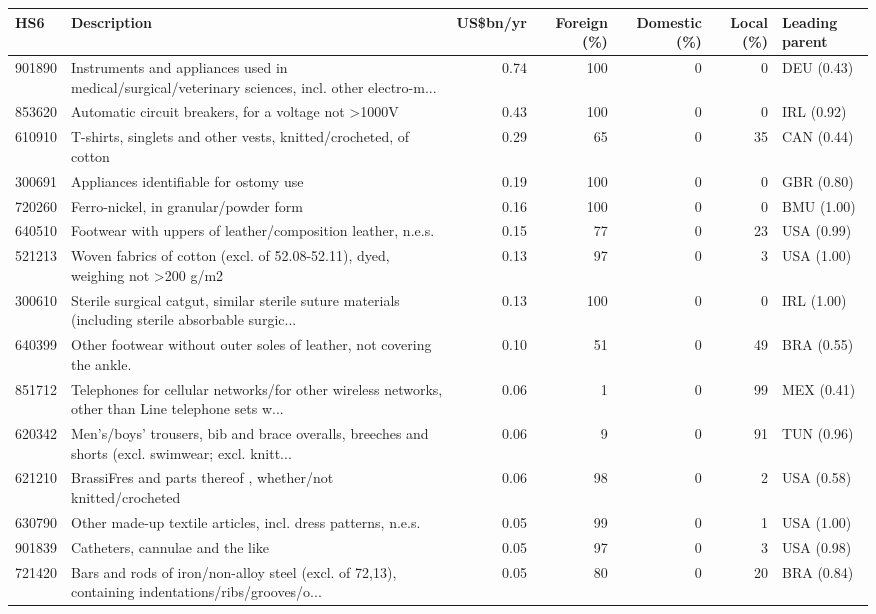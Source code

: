 \begin{tabular}{@{}l p{6.4cm} r r r r l@{}}
\toprule
HS6 & Description & US\$bn/yr & Foreign (\%) & Domestic (\%) & Local (\%) & Leading parent \\
\midrule
901890 & Instruments and appliances used in medical/\allowbreak{}surgical/\allowbreak{}veterinary sciences, incl. other electro-m... & 0.74 & 100 & 0 & 0 & DEU (0.43) \\
853620 & Automatic circuit breakers, for a voltage not >1000V & 0.43 & 100 & 0 & 0 & IRL (0.92) \\
610910 & T-shirts, singlets and other vests, knitted/\allowbreak{}crocheted, of cotton & 0.29 & 65 & 0 & 35 & CAN (0.44) \\
300691 & Appliances identifiable for ostomy use & 0.19 & 100 & 0 & 0 & GBR (0.80) \\
720260 & Ferro-nickel, in granular/\allowbreak{}powder form & 0.16 & 100 & 0 & 0 & BMU (1.00) \\
640510 & Footwear with uppers of leather/\allowbreak{}composition leather, n.e.s. & 0.15 & 77 & 0 & 23 & USA (0.99) \\
521213 & Woven fabrics of cotton (excl. of 52.08-52.11), dyed, weighing not >200 g/\allowbreak{}m2 & 0.13 & 97 & 0 & 3 & USA (1.00) \\
300610 & Sterile surgical catgut, similar sterile suture materials (including sterile absorbable surgic... & 0.13 & 100 & 0 & 0 & IRL (1.00) \\
640399 & Other footwear without  outer soles of  leather, not covering the ankle. & 0.10 & 51 & 0 & 49 & BRA (0.55) \\
851712 & Telephones for cellular networks/\allowbreak{}for other wireless networks, other than Line telephone sets w... & 0.06 & 1 & 0 & 99 & MEX (0.41) \\
620342 & Men's/\allowbreak{}boys' trousers, bib and brace overalls, breeches and shorts (excl. swimwear; excl. knitt... & 0.06 & 9 & 0 & 91 & TUN (0.96) \\
621210 & BrassiFres and parts thereof , whether/\allowbreak{}not knitted/\allowbreak{}crocheted & 0.06 & 98 & 0 & 2 & USA (0.58) \\
630790 & Other made-up textile articles, incl. dress patterns, n.e.s. & 0.05 & 99 & 0 & 1 & USA (1.00) \\
901839 & Catheters, cannulae and the like & 0.05 & 97 & 0 & 3 & USA (0.98) \\
721420 & Bars and rods of iron/\allowbreak{}non-alloy steel (excl. of 72,13), containing indentations/\allowbreak{}ribs/\allowbreak{}grooves/\allowbreak{}o... & 0.05 & 80 & 0 & 20 & BRA (0.84) \\
\bottomrule
\end{tabular}
